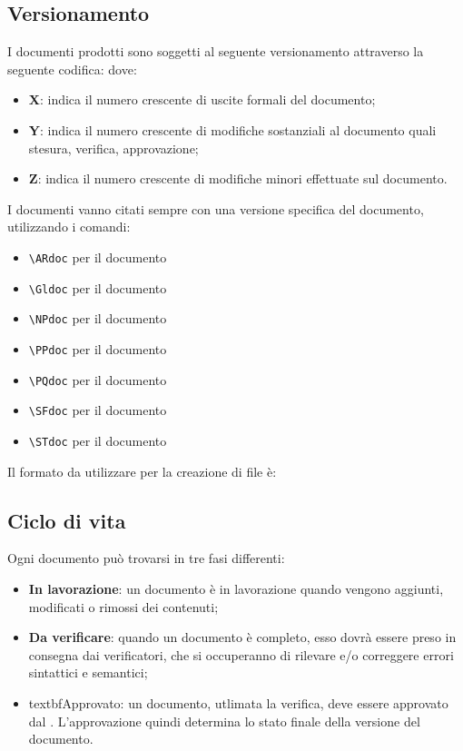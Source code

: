 	\subsection{Versionamento}
	I documenti prodotti sono soggetti al seguente versionamento attraverso la seguente codifica:
	dove:
	\begin{itemize}
		\item \textbf{X}: indica il numero crescente di uscite formali del documento;
		\item \textbf{Y}: indica il numero crescente di modifiche sostanziali al documento quali stesura, verifica, approvazione;
		\item \textbf{Z}: indica il numero crescente di modifiche minori effettuate sul documento.
	\end{itemize}
	I documenti vanno citati sempre con una versione specifica del documento, utilizzando i comandi:
	\begin{itemize}
	\item \texttt{\textbackslash ARdoc} per il documento \ARdoc
	\item \texttt{\textbackslash Gldoc} per il documento \Gldoc
	\item \texttt{\textbackslash NPdoc} per il documento \NPdoc
	\item \texttt{\textbackslash PPdoc} per il documento \PPdoc
	\item \texttt{\textbackslash PQdoc} per il documento \PQdoc
	\item \texttt{\textbackslash SFdoc} per il documento \SFdoc
	\item \texttt{\textbackslash STdoc} per il documento \STdoc
	\end{itemize}
	Il formato da utilizzare per la creazione di file è:
	\subsection{Ciclo di vita}
	Ogni documento può trovarsi in tre fasi differenti:
	\begin{itemize}
		\item \textbf{In lavorazione}: un documento è in lavorazione quando vengono aggiunti, modificati o rimossi dei contenuti;
		\item \textbf{Da verificare}: quando un documento è completo, esso dovrà essere preso in consegna dai verificatori, che si occuperanno di rilevare e/o correggere errori sintattici e semantici;
		\item textbf{Approvato}: un documento, utlimata la verifica, deve essere approvato dal \RES. L'approvazione quindi determina lo stato finale della versione del documento.
		\end{itemize}